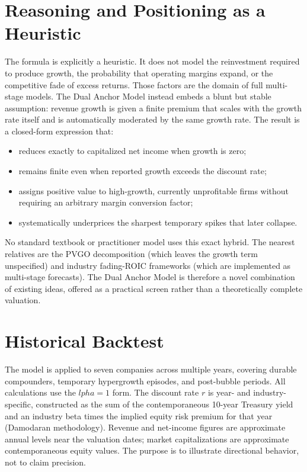 \documentclass[11pt]{article}
\begin{document}
\section{Reasoning and Positioning as a Heuristic}
The formula is explicitly a heuristic. It does not model the reinvestment required to produce growth, the probability that operating margins expand, or the competitive fade of excess returns. Those factors are the domain of full multi-stage models. The Dual Anchor Model instead embeds a blunt but stable assumption: revenue growth is given a finite premium that scales with the growth rate itself and is automatically moderated by the same growth rate. The result is a closed-form expression that:
\begin{itemize}[noitemsep]
\item reduces exactly to capitalized net income when growth is zero;
\item remains finite even when reported growth exceeds the discount rate;
\item assigns positive value to high-growth, currently unprofitable firms without requiring an arbitrary margin conversion factor;
\item systematically underprices the sharpest temporary spikes that later collapse.
\end{itemize}
No standard textbook or practitioner model uses this exact hybrid. The nearest relatives are the PVGO decomposition (which leaves the growth term unspecified) and industry fading-ROIC frameworks (which are implemented as multi-stage forecasts). The Dual Anchor Model is therefore a novel combination of existing ideas, offered as a practical screen rather than a theoretically complete valuation.

\section{Historical Backtest}
The model is applied to seven companies across multiple years, covering durable compounders, temporary hypergrowth episodes, and post-bubble periods. All calculations use the $lpha = 1$ form. The discount rate $r$ is year- and industry-specific, constructed as the sum of the contemporaneous 10-year Treasury yield and an industry beta times the implied equity risk premium for that year (Damodaran methodology). Revenue and net-income figures are approximate annual levels near the valuation dates; market capitalizations are approximate contemporaneous equity values. The purpose is to illustrate directional behavior, not to claim precision.
\end{document}
